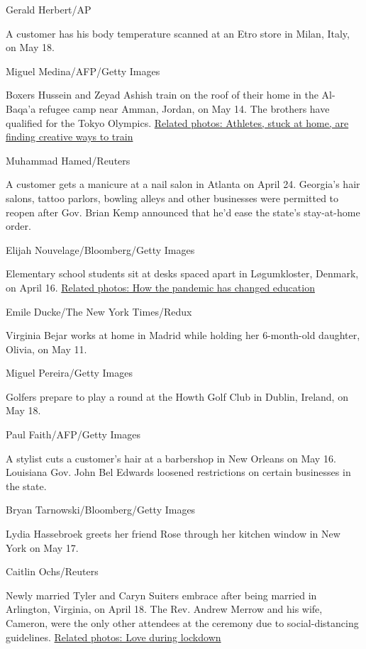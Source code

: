 Gerald Herbert/AP

A customer has his body temperature scanned at an Etro store in Milan,
Italy, on May 18.

Miguel Medina/AFP/Getty Images

Boxers Hussein and Zeyad Ashish train on the roof of their home in the
Al-Baqa'a refugee camp near Amman, Jordan, on May 14. The brothers have
qualified for the Tokyo Olympics.
\href{http://www.cnn.com/2020/05/14/world/gallery/athletes-train-during-lockdown/index.html}{Related
photos: Athletes, stuck at home, are finding creative ways to train}

Muhammad Hamed/Reuters

A customer gets a manicure at a nail salon in Atlanta on April 24.
Georgia's hair salons, tattoo parlors, bowling alleys and other
businesses were permitted to reopen after Gov. Brian Kemp announced that
he'd ease the state's stay-at-home order.

Elijah Nouvelage/Bloomberg/Getty Images

Elementary school students sit at desks spaced apart in Løgumkloster,
Denmark, on April 16.
\href{http://www.cnn.com/2020/05/04/world/gallery/education-coronavirus-wellness/index.html}{Related
photos: How the pandemic has changed education}

Emile Ducke/The New York Times/Redux

Virginia Bejar works at home in Madrid while holding her 6-month-old
daughter, Olivia, on May 11.

Miguel Pereira/Getty Images

Golfers prepare to play a round at the Howth Golf Club in Dublin,
Ireland, on May 18.

Paul Faith/AFP/Getty Images

A stylist cuts a customer's hair at a barbershop in New Orleans on May
16. Louisiana Gov. John Bel Edwards loosened restrictions on certain
businesses in the state.

Bryan Tarnowski/Bloomberg/Getty Images

Lydia Hassebroek greets her friend Rose through her kitchen window in
New York on May 17.

Caitlin Ochs/Reuters

Newly married Tyler and Caryn Suiters embrace after being married in
Arlington, Virginia, on April 18. The Rev. Andrew Merrow and his wife,
Cameron, were the only other attendees at the ceremony due to
social-distancing guidelines.
\href{http://www.cnn.com/2020/04/21/world/gallery/love-during-lockdown/index.html}{Related
photos: Love during lockdown}

